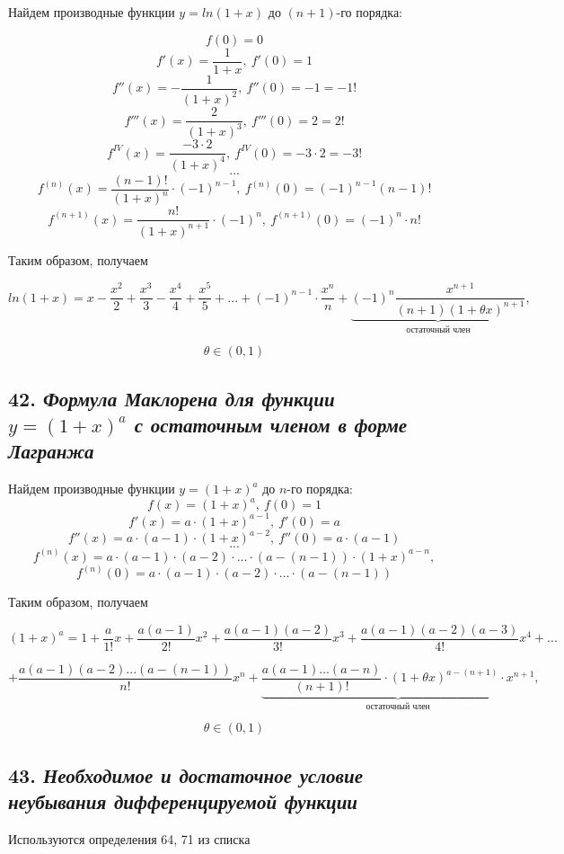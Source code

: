 Найдем производные функции $y = ln(1+x)$ до $(n+1)$-го порядка:

$$f(0) = 0$$ $$f'(x) = \dfrac{1}{1+x}, \ f'(0) = 1$$ $$f''(x) = -\dfrac{1}{(1+x)^2}, \ f''(0) = -1 = -1!$$ $$f'''(x) = \dfrac{2}{(1+x)^3}, \ f'''(0) = 2 = 2!$$ $$f^{IV}(x) = \dfrac{-3\cdot 2}{(1+x)^4}, \ f^{IV}(0) = -3\cdot 2 = -3!$$ $$\dots$$ $$f^{(n)}(x) = \dfrac{(n - 1)!}{(1 + x)^n}\cdot (-1)^{n - 1}, \ f^{(n)}(0)=(-1)^{n-1}(n-1)! $$ $$f^{(n+1)}(x) = \dfrac{n!}{(1 + x)^{n+1}}\cdot (-1)^{n}, \ f^{(n+1)}(0)=(-1)^{n}\cdot n!$$

Таким образом, получаем
\begin{mainQuote}

$$ ln(1 + x) = x - \dfrac{x^2}{2}+ \dfrac{x^3}{3}- \dfrac{x^4}{4}+ \dfrac{x^5}{5} + ... + (-1)^{n - 1}\cdot \dfrac{x^n}{n} + \underbrace{(-1)^n\dfrac{x^{n+1}}{(n+1)(1 + \theta x)^{n+1}}}_{\text{остаточный \ член}}, $$

$$ \theta \in (0, 1)$$
\end{mainQuote}
\newpage 
\subsection*{42. \textit{Формула Маклорена для функции $y = (1 + x)^a$ с остаточным членом в форме Лагранжа}}

Найдем производные функции $y = (1 + x)^a$ до $n$-го порядка: $$f(x) = (1+x)^a , \ f(0) = 1$$ $$f'(x)=a \cdot (1+x)^{a - 1}, \ f'(0) = a$$ $$f''(x)=a \cdot (a - 1) \cdot (1+x)^{a - 2}, \ f''(0) = a\cdot (a - 1)$$ $$...$$ $$f^{(n)}(x) = a\cdot(a - 1)\cdot(a-2)\cdot...\cdot(a - (n - 1))\cdot (1+x)^{a-n},$$ $$ f^{(n)}(0) = a\cdot(a - 1)\cdot(a-2)\cdot...\cdot(a - (n - 1))$$

Таким образом, получаем
\begin{mainQuote}

$$ (1+x)^a = 1 + \dfrac{a}{1!}x + \dfrac{a(a-1)}{2!}x^2+ \dfrac{a(a-1)(a-2)}{3!}x^3+ \dfrac{a(a-1)(a-2)(a-3)}{4!}x^4+... $$

$$ +\dfrac{a(a-1)(a-2)...(a-(n-1))}{n!}x^n + \underbrace{\dfrac{a(a-1)...(a -n)}{(n+1)!}\cdot (1+\theta x)^{a-(n+1)}\cdot x^{n + 1}}_{\text{остаточный \ член}},$$

$$ \theta \in (0, 1)$$
\end{mainQuote}
\newpage 
\subsection*{43. \textit{Необходимое и достаточное условие неубывания дифференцируемой функции}}
\begin{Quote2} 
\small\centering 

Используются определения 64, 71 из списка \end{Quote2} 

